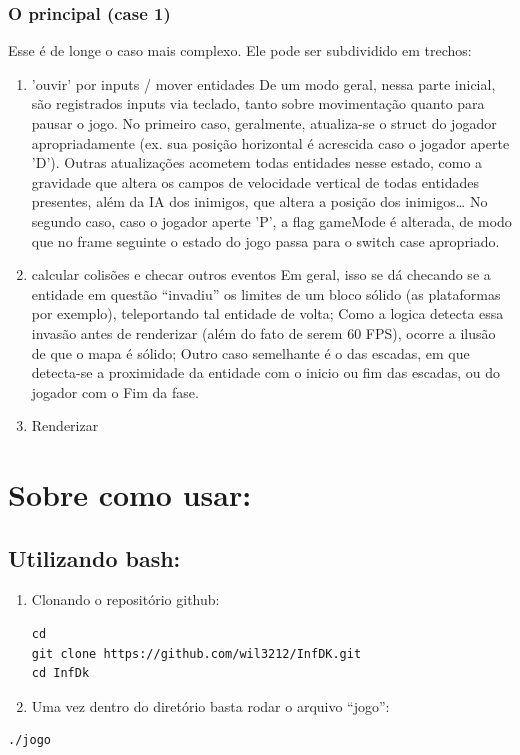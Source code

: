 \documentclass[11pt]{article}
\begin{document}
\subsubsection{O principal (case 1)}
\label{sec:orgc53dec0}
Esse é de longe o caso mais complexo.
Ele pode ser subdividido em trechos:
\begin{enumerate}
\item 'ouvir' por inputs / mover entidades
De um modo geral, nessa parte inicial, são registrados inputs via teclado, tanto sobre movimentação quanto para pausar o jogo.
No primeiro caso, geralmente, atualiza-se o struct do jogador apropriadamente (ex. sua posição horizontal é acrescida caso o jogador aperte 'D'). Outras atualizações acometem todas entidades nesse estado, como a gravidade que altera os campos de velocidade vertical de todas entidades presentes, além da IA dos inimigos, que altera a posição dos inimigos\ldots{}
No segundo caso, caso o jogador aperte 'P', a flag gameMode é alterada, de modo que no frame seguinte o estado do jogo passa para o switch case apropriado.
\item calcular colisões e checar outros eventos
Em geral, isso se dá checando se a entidade em questão ``invadiu'' os limites de um bloco sólido (as plataformas por exemplo), teleportando tal entidade de volta; Como a logica detecta essa invasão antes de renderizar (além do fato de serem 60 FPS), ocorre a ilusão de que o mapa é sólido;
Outro caso semelhante é o das escadas, em que detecta-se a proximidade da entidade com o inicio ou fim das escadas, ou do jogador com o Fim da fase.
\item Renderizar
\end{enumerate}
\section{Sobre como usar:}
\label{sec:org23582ce}
\subsection{Utilizando bash:}
\label{sec:org0278d41}
\begin{enumerate}
\item Clonando o repositório github:
\begin{verbatim}
cd
git clone https://github.com/wil3212/InfDK.git
cd InfDk
\end{verbatim}

\item Uma vez dentro do diretório basta rodar o arquivo ``jogo'':
\end{enumerate}
\begin{verbatim}
./jogo
\end{verbatim}
\end{document}
